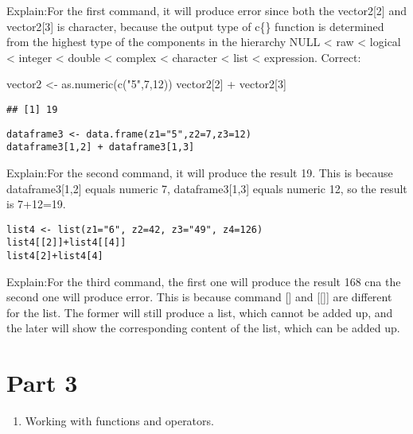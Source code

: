 \documentclass[
]{article}
\newenvironment{Shaded}{\begin{snugshade}}{\end{snugshade}}
\newcommand{\DecValTok}[1]{\textcolor[rgb]{0.00,0.00,0.81}{#1}}
\newcommand{\FunctionTok}[1]{\textcolor[rgb]{0.00,0.00,0.00}{#1}}
\newcommand{\NormalTok}[1]{#1}
\newcommand{\OtherTok}[1]{\textcolor[rgb]{0.56,0.35,0.01}{#1}}
\newcommand{\SpecialCharTok}[1]{\textcolor[rgb]{0.00,0.00,0.00}{#1}}
\newcommand{\StringTok}[1]{\textcolor[rgb]{0.31,0.60,0.02}{#1}}
\providecommand{\tightlist}{%
  \setlength{\itemsep}{0pt}\setlength{\parskip}{0pt}}
\begin{document}
Explain:For the first command, it will produce error since both the
vector2{[}2{]} and vector2{[}3{]} is character, because the output type
of c\{\} function is determined from the highest type of the components
in the hierarchy NULL \textless{} raw \textless{} logical \textless{}
integer \textless{} double \textless{} complex \textless{} character
\textless{} list \textless{} expression. Correct:

\begin{Shaded}
\begin{Highlighting}[]
\NormalTok{vector2 }\OtherTok{\textless{}{-}} \FunctionTok{as.numeric}\NormalTok{(}\FunctionTok{c}\NormalTok{(}\StringTok{"5"}\NormalTok{,}\DecValTok{7}\NormalTok{,}\DecValTok{12}\NormalTok{))}
\NormalTok{vector2[}\DecValTok{2}\NormalTok{] }\SpecialCharTok{+}\NormalTok{ vector2[}\DecValTok{3}\NormalTok{]}
\end{Highlighting}
\end{Shaded}

\begin{verbatim}
## [1] 19
\end{verbatim}

\begin{verbatim}
dataframe3 <- data.frame(z1="5",z2=7,z3=12)
dataframe3[1,2] + dataframe3[1,3]
\end{verbatim}

Explain:For the second command, it will produce the result 19. This is
because dataframe3{[}1,2{]} equals numeric 7, dataframe3{[}1,3{]} equals
numeric 12, so the result is 7+12=19.

\begin{verbatim}
list4 <- list(z1="6", z2=42, z3="49", z4=126)
list4[[2]]+list4[[4]]
list4[2]+list4[4]
\end{verbatim}

Explain:For the third command, the first one will produce the result 168
cna the second one will produce error. This is because command {[}{]}
and {[}{[}{]}{]} are different for the list. The former will still
produce a list, which cannot be added up, and the later will show the
corresponding content of the list, which can be added up.

\hypertarget{part-3}{%
\section{Part 3}\label{part-3}}

\begin{enumerate}
\def\labelenumi{\arabic{enumi}.}
\setcounter{enumi}{2}
\tightlist
\item
  Working with functions and operators.
\end{enumerate}
\end{document}
